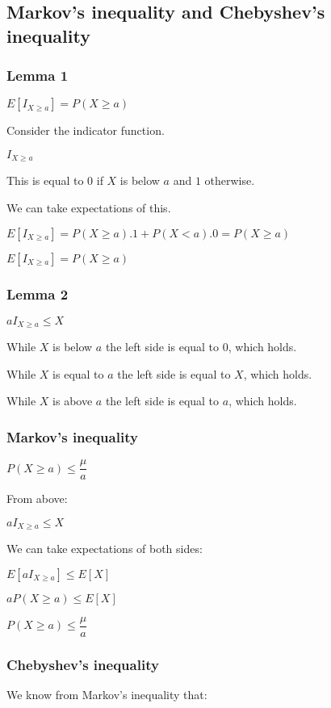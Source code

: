 
\subsection{Markov's inequality and Chebyshev's inequality}
\subsubsection{Lemma 1}

\(E[I_{X\ge a}]=P(X\ge a)\)

Consider the indicator function.

\(I_{X\ge a}\)

This is equal to \(0\) if \(X\) is below \(a\) and \(1\) otherwise.

We can take expectations of this.

\(E[I_{X\ge a}]=P(X\ge a).1+P(X<a).0=P(X\ge a)\)

\(E[I_{X\ge a}]=P(X\ge a)\)

\subsubsection{Lemma 2}

\(aI_{X\ge a}\le X\)

While \(X\) is below \(a\) the left side is equal to \(0\), which holds.

While \(X\) is equal to \(a\) the left side is equal to \(X\), which holds.

While \(X\) is above \(a\) the left side is equal to \(a\), which holds.

\subsubsection{Markov’s inequality}

\(P(X\ge a)\le \dfrac{\mu  }{a}\)

From above:

\(aI_{X\ge a}\le X\)

We can take expectations of both sides:

\(E[aI_{X\ge a}]\le E[X]\)

\(aP(X\ge a)\le E[X]\)

\(P(X\ge a)\le \dfrac{\mu  }{a}\)

\subsubsection{Chebyshev’s inequality}

We know from Markov’s inequality that:

